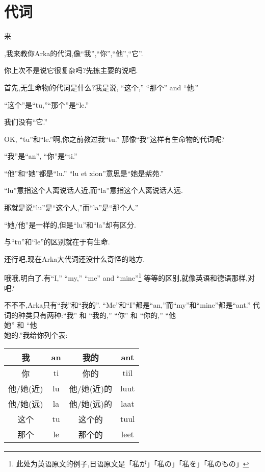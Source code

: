 \chapter[代词]{代词}


\hypertarget{chapter-pronouns}{来},我来教你Arka的代词,像``我'',``你'',``他'',``它''.


你上次不是说它很复杂吗?先拣主要的说吧.

首先,无生命物的代词是什么?我是说, ``这个,'' ``那个'' and ``他.''


``这个''是``tu,''``那个''是``le.''

我们没有``它.''


OK, ``tu''和``le.''啊,你之前教过我``tu.''
那像``我''这样有生命物的代词呢?


``我''是``an'', ``你''是``ti.''

``他''和``她''都是``lu.'' ``lu et xion''意思是``她是紫苑.''

``lu''意指这个人离说话人近,而``la''意指这个人离说话人远.


那就是说``lu''是``这个人,''而``la''是``那个人.''

``她/他''是一样的,但是``lu''和``la''却有区分.

与``tu''和``le''的区别就在于有生命.

还行吧,现在Arka大代词还没什么奇怪的地方.

哦哦,明白了.有``I,'' ``my,'' ``me'' and ``mine''\footnote{此处为英语原文的例子,日语原文是「私が」「私の」「私を」「私のもの」}
等等的区别,就像英语和德语那样,对吧?


不不不,Arka只有``我''和``我的''.
``Me''和``I''都是``an,''而``my''和``mine''都是``ant.''
代词的种类只有两种:``我'' 和 ``我的,'' ``你'' 和 ``你的,'' ``他\\她'' 和 ``他\\她的.''我给你列个表:
\begin{table}[H]
    \begin{tabular}{|c|c|c|c|} %
    \hline
	我&  an&  我的&  ant\\\hline
	你&  ti&  你的&  tiil\\\hline
  	他/她(近)&  lu&  他/她(近)的&  luut\\\hline
	他/她(远)&  la&  他/她(远)的&  laat\\\hline
	这个&  tu&  这个的&  tuul\\\hline
	那个&  le&  那个的&  leet\\\hline
	\end{tabular}
\end{table}

